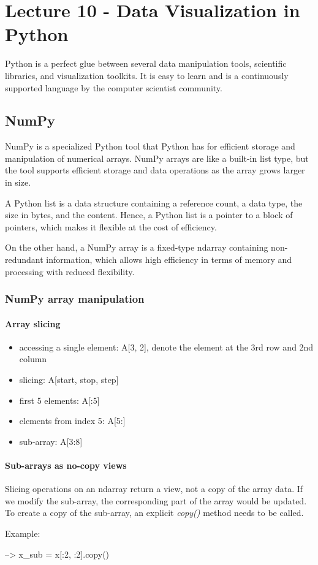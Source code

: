 \chapter{Lecture 10 - Data Visualization in Python}
Python is a perfect glue between several data manipulation tools, scientific libraries, and visualization toolkits. It is easy to learn and is a continuously supported language by the computer scientist community.

\section{NumPy}
NumPy is a specialized Python tool that Python has for efficient storage and manipulation of numerical arrays. NumPy arrays are like a built-in list type, but the tool supports efficient storage and data operations as the array grows larger in size.\par
A Python list is a data structure containing a reference count, a data type, the size in bytes, and the content. Hence, a Python list is a pointer to a block of pointers, which makes it flexible at the cost of efficiency.\par
On the other hand, a NumPy array is a fixed-type ndarray containing non-redundant information, which allows high efficiency in terms of memory and processing with reduced flexibility. 

\subsection{NumPy array manipulation}

\subsubsection{Array slicing}
\begin{itemize}[noitemsep]
    \item accessing a single element: A[3, 2], denote the element at the 3rd row and 2nd column
    \item slicing: A[start, stop, step]
    \item first 5 elements: A[:5]
    \item elements from index 5: A[5:]
    \item sub-array: A[3:8]
\end{itemize}

\subsubsection{Sub-arrays as no-copy views}
Slicing operations on an ndarray return a view, not a copy of the array data. If we modify the sub-array, the corresponding part of the array would be updated. To create a copy of the sub-array, an explicit \textit{copy()} method needs to be called. \par
Example: \par
--> x\_sub = x[:2, :2].copy()

